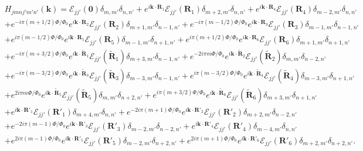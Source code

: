 \begin{equation}
	\begin{aligned}
		&H_{jmnj'm'n'}(\mathbf{k})
		= \mathcal{E}_{jj'}(\mathbf{0}) \delta_{m,m'} \delta_{n,n'} + e^{i\mathbf{k} \cdot \mathbf{R}_{1}}\mathcal{E}_{jj'}(\mathbf{R}_{1}) \delta_{m+2,m'}\delta_{n,n'} + e^{i\mathbf{k} \cdot \mathbf{R}_{4}}\mathcal{E}_{jj'}(\mathbf{R}_{4})  \delta_{m-2,m'} \delta_{n,n'}  \\
		& + e^{-i\pi(m + 1/2)\Phi/\Phi_{0}}e^{i\mathbf{k} \cdot \mathbf{R}_{2}} \mathcal{E}_{jj'}(\mathbf{R}_{2}) \delta_{m+1,m'}\delta_{n-1,n'} + e^{-i\pi(m - 1/2)\Phi/\Phi_{0}} e^{i\mathbf{k} \cdot \mathbf{R}_{3}} \mathcal{E}_{jj'}(\mathbf{R}_{3}) \delta_{m-1,m'}\delta_{n-1,n'} \\
		& + e^{i\pi(m - 1/2)\Phi/\Phi_{0}} e^{i\mathbf{k} \cdot \mathbf{R}_{5}} \mathcal{E}_{jj'}(\mathbf{R}_{5}) \delta_{m-1,m'}\delta_{n+1,n'} + e^{i\pi(m + 1/2)\Phi/\Phi_{0}} e^{i\mathbf{k} \cdot \mathbf{R}_{6}} \mathcal{E}_{jj'}(\mathbf{R}_{6}) \delta_{m+1,m'}\delta_{n+1,n'} \\
		& + e^{- i\pi(m + 3/2)\Phi/\Phi_{0} } e^{i \mathbf{k} \cdot \tilde{\mathbf{R}}_{1}} \mathcal{E}_{jj'}(\tilde{\mathbf{R}}_{1}) \delta_{m+3,m'}\delta_{n-1,n'} + e^{- 2i\pi m\Phi/\Phi_{0} } e^{i \mathbf{k} \cdot \tilde{\mathbf{R}}_{2}} \mathcal{E}_{jj'}(\tilde{\mathbf{R}}_{2}) \delta_{m,m'}\delta_{n-2,n'} \\
		& + e^{- i\pi(m - 3/2)\Phi/\Phi_{0} } e^{i \mathbf{k} \cdot \tilde{\mathbf{R}}_{3}} \mathcal{E}_{jj'}(\tilde{\mathbf{R}}_{3}) \delta_{m-3,m'}\delta_{n-1,n'} + e^{ i\pi (m-3/2)\Phi/\Phi_{0} } e^{i \mathbf{k} \cdot \tilde{\mathbf{R}}_{4}} \mathcal{E}_{jj'}(\tilde{\mathbf{R}}_{4}) \delta_{m-3,m'}\delta_{n+1,n'} \\
		& + e^{2 i\pi m \Phi/\Phi_{0} } e^{i \mathbf{k} \cdot \tilde{\mathbf{R}}_{5}} \mathcal{E}_{jj'}(\tilde{\mathbf{R}}_{5}) \delta_{m,m'}\delta_{n+2,n'} + e^{ i\pi (m+3/2)\Phi/\Phi_{0} } e^{i \mathbf{k} \cdot \tilde{\mathbf{R}}_{6}} \mathcal{E}_{jj'}(\tilde{\mathbf{R}}_{6})\delta_{m+3,m'}\delta_{n+1,n'} \\
		& + e^{i \mathbf{k} \cdot \mathbf{R}'_{1}} \mathcal{E}_{jj'}(\mathbf{R}'_{1}) \delta_{m+4,m'}\delta_{n,n'} + e^{-2i\pi(m + 1)\Phi / \Phi_{0}} e^{i \mathbf{k} \cdot \mathbf{R}'_{2}} \mathcal{E}_{jj'}(\mathbf{R}'_{2}) \delta_{m+2,m'}\delta_{n-2,n'}  \\
		& + e^{-2i\pi(m - 1)\Phi / \Phi_{0}} e^{i \mathbf{k} \cdot \mathbf{R}'_{3}} \mathcal{E}_{jj'}(\mathbf{R}'_{3}) \delta_{m-2,m'}\delta_{n-2,n'} + e^{i \mathbf{k} \cdot \mathbf{R}'_{4}} \mathcal{E}_{jj'}(\mathbf{R}'_{4}) \delta_{m-4,m'}\delta_{n,n'}                                 \\
		& + e^{2i\pi(m - 1)\Phi / \Phi_{0}} e^{i \mathbf{k} \cdot \mathbf{R}'_{5}} \mathcal{E}_{jj'}(\mathbf{R}'_{5}) \delta_{m-2,m'}\delta_{n+2,n'} + e^{2i\pi(m + 1)\Phi / \Phi_{0}} e^{i \mathbf{k} \cdot \mathbf{R}'_{6}} \mathcal{E}_{jj'}(\mathbf{R}'_{6}) \delta_{m+2,m'}\delta_{n+2,n'}.
	\end{aligned}
\end{equation}

